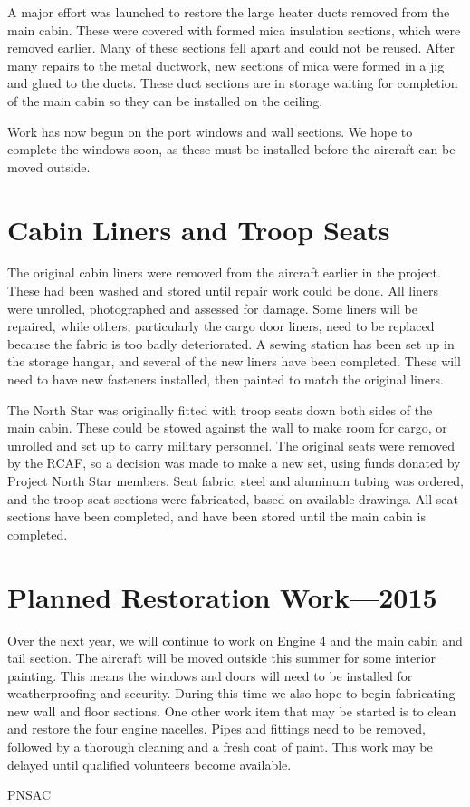 A major effort was launched to restore the large heater ducts removed
from the main cabin.  These were covered with formed mica insulation
sections, which were removed earlier.  Many of these sections fell
apart and could not be reused.  After many repairs to the metal
ductwork, new sections of mica were formed in a jig and glued to the
ducts.  These duct sections are in storage waiting for completion of
the main cabin so they can be installed on the ceiling.

Work has now begun on the port windows and wall sections.  We hope to
complete the windows soon, as these must be installed before the
aircraft can be moved outside.

\section{Cabin Liners and Troop Seats}
\label{sec:liners_troop_seats}

The original cabin liners were removed from the aircraft earlier in
the project.  These had been washed and stored until repair work could
be done.  All liners were unrolled, photographed and assessed for
damage.  Some liners will be repaired, while others, particularly the
cargo door liners, need to be replaced because the fabric is too badly
deteriorated.  A sewing station has been set up in the storage hangar,
and several of the new liners have been completed.  These will need to
have new fasteners installed, then painted to match the original
liners.

The North Star was originally fitted with troop seats down both sides
of the main cabin.  These could be stowed against the wall to make
room for cargo, or unrolled and set up to carry military personnel.
The original seats were removed by the RCAF, so a decision was made to
make a new set, using funds donated by Project North Star members.
Seat fabric, steel and aluminum tubing was ordered, and the troop seat
sections were fabricated, based on available drawings.  All seat
sections have been completed, and have been stored until the main
cabin is completed.

\section{Planned Restoration Work---2015}
\label{sec:plannedwork}

Over the next year, we will continue to work on Engine 4 and the main
cabin and tail section.  The aircraft will be moved outside this
summer for some interior painting.  This means the windows and doors
will need to be installed for weatherproofing and security.  During
this time we also hope to begin fabricating new wall and floor
sections.  One other work item that may be started is to clean and
restore the four engine nacelles.  Pipes and fittings need to be
removed, followed by a thorough cleaning and a fresh coat of paint.
This work may be delayed until qualified volunteers become available.

\begin{footnotesize}
  \raggedleft PNSAC\\
\end{footnotesize}



